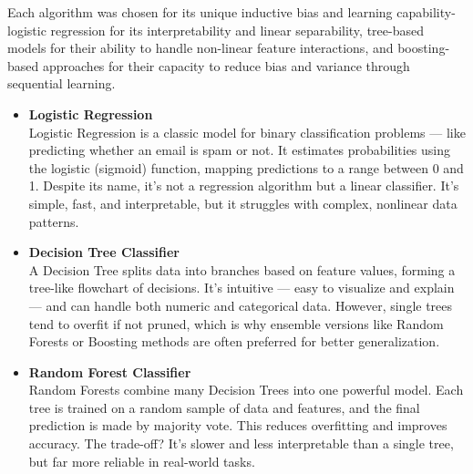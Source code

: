 Each algorithm was chosen for its unique inductive bias and learning capability- logistic regression for its interpretability and linear separability, tree-based models for their ability to handle non-linear feature interactions, and boosting-based approaches for their capacity to reduce bias and variance through sequential learning.

\begin{itemize}
    \item \textbf{Logistic Regression}\\
    Logistic Regression is a classic model for binary classification problems — like predicting whether an email is spam or not.
    It estimates probabilities using the logistic (sigmoid) function, mapping predictions to a range between 0 and 1.
    Despite its name, it’s not a regression algorithm but a linear classifier.
    It’s simple, fast, and interpretable, but it struggles with complex, nonlinear data patterns.


    \item \textbf{Decision Tree Classifier}\\
    A Decision Tree splits data into branches based on feature values, forming a tree-like flowchart of decisions.
    It’s intuitive — easy to visualize and explain — and can handle both numeric and categorical data.
    However, single trees tend to overfit if not pruned, which is why ensemble versions like Random Forests or Boosting methods are often preferred for better generalization.


    \item \textbf{Random Forest Classifier}\\
    Random Forests combine many Decision Trees into one powerful model.
    Each tree is trained on a random sample of data and features, and the final prediction is made by majority vote.
    This reduces overfitting and improves accuracy.
    The trade-off?
    It’s slower and less interpretable than a single tree, but far more reliable in real-world tasks.


\end{itemize}
